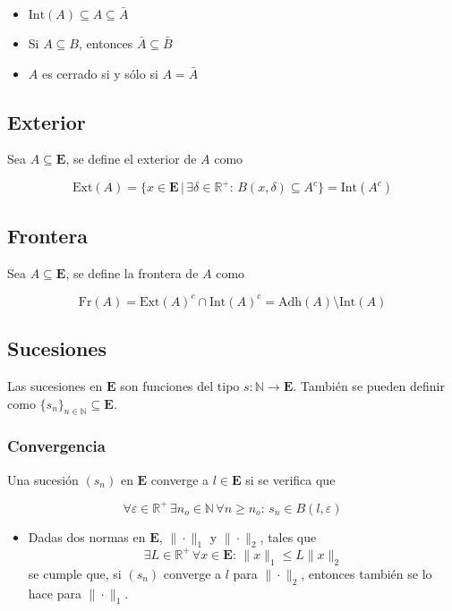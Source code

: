 \begin{itemize}
    \item $\mathrm{Int}(A)\subseteq A\subseteq \bar{A}$
    \item Si $A\subseteq B$, entonces $\bar{A}\subseteq\bar{B}$
    \item $A$ es cerrado si y sólo si $A=\bar{A}$
\end{itemize}

\subsection{Exterior}

Sea $A\subseteq\mathbf{E}$, se define el exterior de $A$ como

\[\mathrm{Ext}(A) = \{x\in\mathbf{E}\,|\,
\exists\delta\in\mathbb{R}^+:\,B(x,\delta)\subseteq A^c\}=
\mathrm{Int}(A^c)\]

\subsection{Frontera}

Sea $A\subseteq\mathbf{E}$, se define la frontera de $A$ como

\[\mathrm{Fr}(A)=\mathrm{Ext}(A)^c\cap\mathrm{Int}(A)^c
=\mathrm{Adh}(A)\setminus\mathrm{Int}(A)\]

\subsection{Sucesiones}

Las sucesiones en $\mathbf{E}$ son funciones del tipo $s:\mathbb{N}\to\mathbf{E}$. También se pueden definir como $\{s_n\}_{n\in\mathbb{N}}\subseteq\mathbf{E}$.

\subsubsection{Convergencia}

Una sucesión $(s_n)$ en $\mathbf{E}$ converge a $l\in\mathbf{E}$ si se verifica que

\[\forall\varepsilon\in\mathbb{R}^+\,
\exists n_o\in\mathbb{N}\, \forall n\geq n_o:\,
s_n\in B(l, \varepsilon)\]

\begin{itemize}
\item Dadas dos normas en $\mathbf{E}$, $\|\cdot\|_1$ y $\|\cdot\|_2$, tales que
\[\exists L\in\mathbb{R}^+\,\forall x\in\mathbf{E}:\,
\|x\|_1\leq L\|x\|_2\]
se cumple que, si $(s_n)$ converge a $l$ para $\|\cdot\|_2$, entonces también se lo hace para $\|\cdot\|_1$.
\end{itemize}

